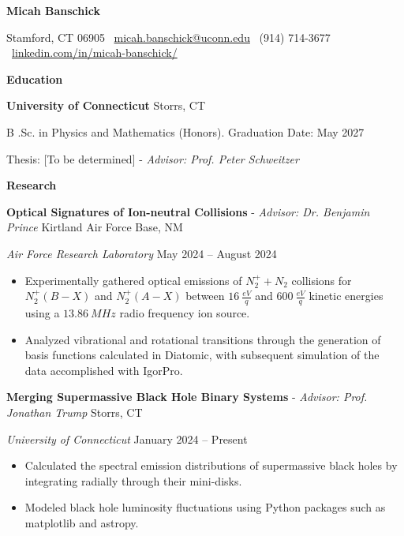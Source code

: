 \documentclass[11pt]{article}
\begin{document}
\begin{center}
    \textbf{Micah Banschick}\\ 
    \hrulefill
\end{center}

\begin{center}
    Stamford, CT 06905 \textbullet \ \href{mailto:micah.banschick@uconn.edu}{micah.banschick@uconn.edu} \textbullet \ (914) 714-3677 \textbullet \ \href{https://www.linkedin.com/in/micah-banschick/}{linkedin.com/in/micah-banschick/}
\end{center}

\vspace{0.5pt}

\begin{center}
    \textbf{Education}
\end{center}
\textbf{University of Connecticut} \hfill Storrs, CT

B .Sc. in Physics and Mathematics (Honors). \hfill Graduation Date: May 2027

Thesis: [To be determined] - \textit{Advisor: Prof. Peter Schweitzer}

\vspace{12pt}


\begin{center}
    \textbf{Research}
\end{center}
\textbf{Optical Signatures of Ion-neutral Collisions} - \textit{Advisor: Dr. Benjamin Prince} \hfill Kirtland Air Force Base, NM

\textit{Air Force Research Laboratory} \hfill May 2024 – August 2024
\begin{itemize}[noitemsep, topsep=0pt, partopsep=0pt, parsep=0pt]
    \item Experimentally gathered optical emissions of $N^+_2 + N_2$ collisions for $N^+_2(B-X)$ and $N^+_2(A-X)$ between $16\ \frac{eV}{q}$ and $600\ \frac{eV}{q}$ kinetic energies using a $13.86\ MHz$ radio frequency ion source.
    \item Analyzed vibrational and rotational transitions through the generation of basis functions calculated in Diatomic, with subsequent simulation of the data accomplished with IgorPro.
\end{itemize}

\vspace{8pt}

\textbf{Merging Supermassive Black Hole Binary Systems} - \textit{Advisor: Prof. Jonathan Trump} \hfill Storrs, CT

\textit{University of Connecticut} \hfill January 2024 – Present
\begin{itemize}[noitemsep, topsep=0pt, partopsep=0pt, parsep=0pt]
    \item Calculated the spectral emission distributions of supermassive black holes by integrating radially through their mini-disks.
    \item Modeled black hole luminosity fluctuations using Python packages such as matplotlib and astropy.
\end{itemize}
\end{document}
